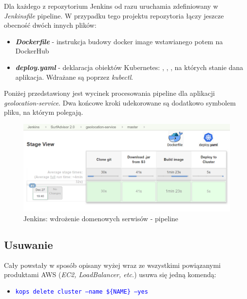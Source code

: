 \newpage

Dla każdego z repozytorium Jenkins od razu uruchamia zdefiniowany w \emph{Jenkinsfile} pipeline.
W przypadku tego projektu repozytoria łączy jeszcze obecność dwóch innych plików:
\begin{itemize}
    \item
    \emph{\textbf{Dockerfile}} - instrukcja budowy docker image wstawianego potem na DockerHub
    \item
    \emph{\textbf{deploy.yaml}} - deklaracja obiektów Kubernetes: , , , na których stanie dana aplikacja.
    Wdrażane są poprzez \emph{kubectl}.
\end{itemize} 

Poniżej przedstawiony jest wycinek procesowania pipeline dla aplikacji \emph{geolocation-service}.
Dwa końcowe kroki udekorowane są dodatkowo symbolem pliku, na którym polegają.

\begin{figure}[!ht]
	\begin{center}
		\includegraphics[width=1\textwidth]{img/jenkins-geo-stages}
	\end{center}
	\caption{Jenkins: wdrożenie domenowych serwisów - pipeline}
\end{figure}

\subsection{Usuwanie}

Cały powstały w sposób opisany wyżej  wraz ze wszystkimi powiązanymi produktami AWS (\emph{EC2, LoadBalancer, etc.}) usuwa się jedną komendą:

\begin{itemize}
    \item
    \textcolor{blue}{\texttt{kops delete cluster --name \$\{NAME\} --yes}}
\end{itemize} 

